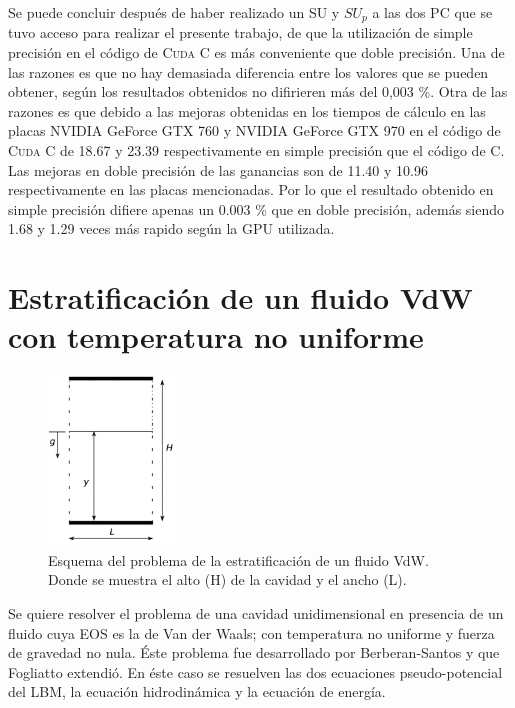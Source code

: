 Se puede concluir después de haber realizado un SU y $SU_p$ a las dos PC que se tuvo acceso para realizar el presente trabajo, de que la utilización de simple precisión en el código de \textsc{Cuda C} es más conveniente que doble precisión. Una de las razones es que no hay demasiada diferencia entre los valores que se pueden obtener, según los resultados obtenidos no difirieren más del 0,003 \%. Otra de las razones es que debido a las mejoras obtenidas en los tiempos de cálculo en las placas NVIDIA GeForce GTX 760 y NVIDIA GeForce GTX 970 en el código de \textsc{Cuda C} de 18.67 y 23.39 respectivamente en simple precisión que el código de \textsc{C}. Las mejoras en doble precisión de las ganancias son de 11.40 y 10.96 respectivamente en las placas mencionadas. Por lo que el resultado obtenido en simple precisión difiere apenas un 0.003 \% que en doble precisión, además siendo 1.68 y 1.29 veces más rapido según la GPU utilizada.

\newpage

\section{Estratificación de un fluido VdW con temperatura no uniforme}

\begin{figure}[htbp]
	\centering
	\includegraphics[width=0.3\textwidth]{figs/cap4/esquema_problema_VdW}
	\caption{Esquema del problema de la estratificación de un fluido VdW. Donde se muestra el alto (H) de la cavidad y el ancho (L).} 
	\label{fig:esquema_VdW}	
\end{figure}

Se quiere resolver el problema de una cavidad unidimensional en presencia de un fluido cuya EOS es la de Van der Waals; con temperatura  no uniforme y fuerza de gravedad no nula. Éste problema fue desarrollado por Berberan-Santos \cite{berberan2002liquid} y que Fogliatto \cite{fogliatto2019simulation} extendió. En éste caso se resuelven las dos ecuaciones pseudo-potencial del LBM, la ecuación hidrodinámica y la ecuación de energía.

